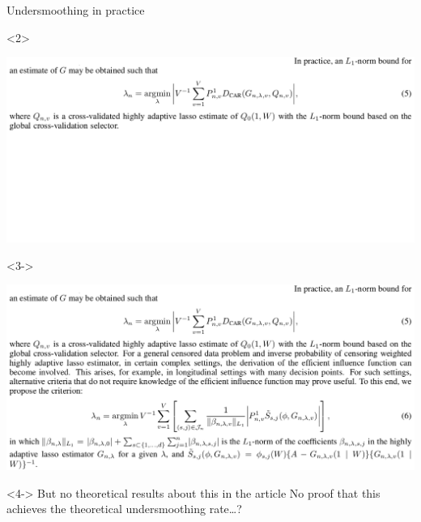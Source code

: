 \documentclass[smaller]{beamer}\usepackage{listings}
\begin{document}
\begin{frame}[label={sec:org340365a}]{Undersmoothing in practice}
\pause

\begin{onlyenv}<2>
\begin{center}
\includegraphics[width=1.02\textwidth]{./screenshots/undersmoothing-practice0.png}
\end{center}
\end{onlyenv}

\begin{onlyenv}<3->
\begin{center}
\includegraphics[width=1.02\textwidth]{./screenshots/undersmoothing-practice1.png}
\end{center}
\end{onlyenv}

\begin{block}<4->{\color{red} But no theoretical results about this in the article}
No proof that this achieves the theoretical undersmoothing rate\ldots{}?
\end{block}
\end{frame}
\end{document}
